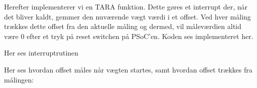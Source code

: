 \documentclass[a4paper, 11pt, articel,oneside,openany]{memoir} %
\begin{document}
Herefter implementerer vi en TARA funktion. Dette gøres et interrupt der, når det bliver kaldt, gemmer den nuværende vægt værdi i et offset. Ved hver måling trækkes dette offset fra den aktuelle måling og dermed, vil måleværdien altid være 0 efter et tryk på reset switchen på PSoC'en. Koden ses implementeret her.

Her ses interruptrutinen




\clearpage
Her ses hvordan offset måles når vægten startes, samt hvordan offset trækkes fra målingen:



\end{document}
